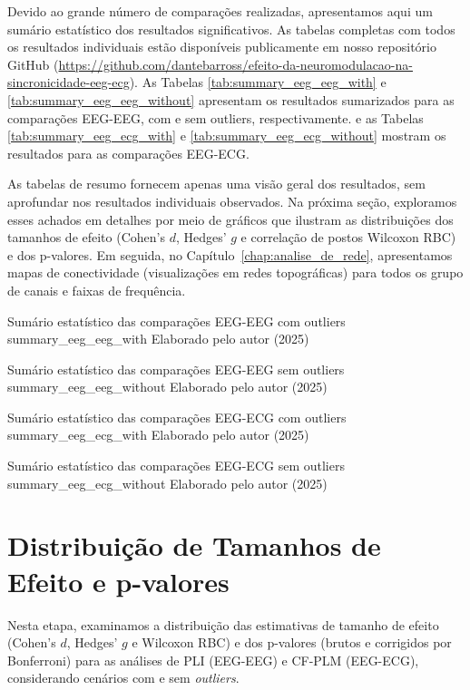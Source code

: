 Devido ao grande número de comparações realizadas, apresentamos aqui um sumário estatístico dos resultados significativos. As tabelas completas com todos os resultados individuais estão disponíveis publicamente em nosso repositório GitHub \cite{barros2025repository} (\url{https://github.com/dantebarross/efeito-da-neuromodulacao-na-sincronicidade-eeg-ecg}). As Tabelas \ref{tab:summary_eeg_eeg_with} e \ref{tab:summary_eeg_eeg_without} apresentam os resultados sumarizados para as comparações EEG-EEG, com e sem outliers, respectivamente. e as Tabelas \ref{tab:summary_eeg_ecg_with} e \ref{tab:summary_eeg_ecg_without} mostram os resultados para as comparações EEG-ECG.

As tabelas de resumo fornecem apenas uma visão geral dos resultados, sem aprofundar nos resultados individuais observados. Na próxima seção, exploramos esses achados em detalhes por meio de gráficos que ilustram as distribuições dos tamanhos de efeito (Cohen's \(d\), Hedges' \(g\) e correlação de postos Wilcoxon RBC) e dos p-valores. Em seguida, no Capítulo~\ref{chap:analise_de_rede}, apresentamos mapas de conectividade (visualizações em redes topográficas) para todos os grupo de canais e faixas de frequência.

{Sumário estatístico das comparações EEG-EEG com outliers}
{summary_eeg_eeg_with}
{Elaborado pelo autor (2025)}

{Sumário estatístico das comparações EEG-EEG sem outliers}
{summary_eeg_eeg_without}
{Elaborado pelo autor (2025)}

{Sumário estatístico das comparações EEG-ECG com outliers}
{summary_eeg_ecg_with}
{Elaborado pelo autor (2025)}

{Sumário estatístico das comparações EEG-ECG sem outliers}
{summary_eeg_ecg_without}
{Elaborado pelo autor (2025)}

\section{Distribuição de Tamanhos de Efeito e p-valores}
\label{sec:effect_size_distribution}
Nesta etapa, examinamos a distribuição das estimativas de tamanho de efeito (Cohen's \(d\), Hedges' \(g\)  e Wilcoxon RBC) e dos p-valores (brutos e corrigidos por Bonferroni) para as análises de PLI (EEG-EEG) e CF-PLM (EEG-ECG), considerando cenários com e sem \textit{outliers}. 

